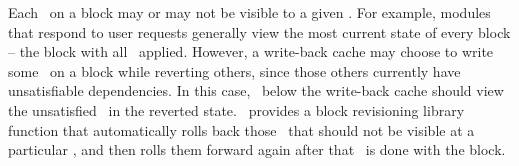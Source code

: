 Each \chdesc\ on a block may or may not be visible to a given \module.
%
For example, modules that respond to user requests generally view the most
 current state of every block -- the block with all \chdescs\ applied.
%
However, a write-back cache may choose to write some \chdescs\ on a block
 while reverting others, since those others currently have unsatisfiable
 dependencies.
%
In this case, \modules\ below the write-back cache should view the
 unsatisfied \chdescs\ in the reverted state.
%
%
\Kudos\ provides a block revisioning library function that automatically rolls back those
 \chdescs\ that should not be visible at a particular \module, and then
 rolls them forward again after that \module\ is done with the block.






